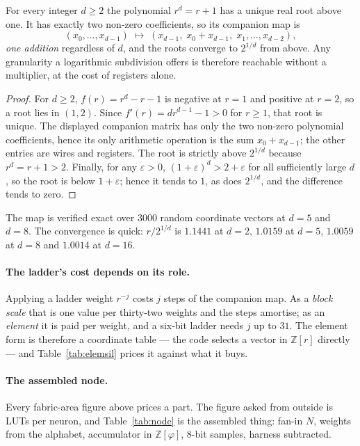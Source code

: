 \begin{theorem}\label{thm:oneadder}
For every integer $d\geq2$ the polynomial $r^{d}=r+1$ has a unique real root above one. It
has exactly two non-zero coefficients, so its companion map is
\[
  (x_0,\dots,x_{d-1}) \;\mapsto\; (x_{d-1},\; x_0+x_{d-1},\; x_1,\dots,x_{d-2}),
\]
\emph{one addition} regardless of $d$, and the roots converge to $2^{1/d}$ from
above. Any granularity a logarithmic subdivision offers is therefore reachable
without a multiplier, at the cost of registers alone.
\end{theorem}
\begin{proof}
For $d\geq2$, $f(r)=r^d-r-1$ is negative at $r=1$ and positive at $r=2$,
so a root lies in $(1,2)$. Since $f'(r)=dr^{d-1}-1>0$ for $r\geq1$,
that root is unique. The displayed companion matrix has only the two
non-zero polynomial coefficients, hence its only arithmetic operation is the
sum $x_0+x_{d-1}$; the other entries are wires and registers. The root is
strictly above $2^{1/d}$ because $r^d=r+1>2$. Finally, for any
$\varepsilon>0$, $(1+\varepsilon)^d>2+\varepsilon$ for all sufficiently
large $d$, so the root is below $1+\varepsilon$; hence it tends to $1$,
as does $2^{1/d}$, and the difference tends to zero.
\end{proof}

The map is verified exact over $3000$ random coordinate vectors at $d=5$ and
$d=8$. The convergence is quick: $r/2^{1/d}$ is $1.1441$ at $d=2$, $1.0159$ at
$d=5$, $1.0059$ at $d=8$ and $1.0014$ at $d=16$.

\paragraph{The ladder's cost depends on its role.} Applying a ladder weight
$r^{-j}$ costs $j$ steps of the companion map. As a \emph{block scale} that is
one value per thirty-two weights and the steps amortise; as an \emph{element} it
is paid per weight, and a six-bit ladder needs $j$ up to $31$. The element form
is therefore a coordinate table --- the code selects a vector in
$\mathbb{Z}[r]$ directly --- and Table~\ref{tab:elemsil} prices it against what
it buys.

\paragraph{The assembled node.} Every fabric-area figure above prices a part. The
figure asked from outside is LUTs per neuron, and Table~\ref{tab:node} is the
assembled thing: fan-in $N$, weights from the alphabet, accumulator in
$\mathbb{Z}[\varphi]$, 8-bit samples, harness subtracted.

